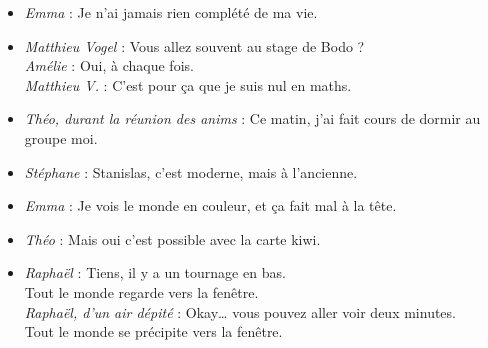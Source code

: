 \begin{itemize}
\item \textit{Emma} : \og Je n'ai jamais rien complété de ma vie. \fg

\item \textit{Matthieu Vogel} : \og Vous allez souvent au stage de Bodo ? \fg \\
\textit{Amélie} : \og Oui, à chaque fois. \fg \\
\textit{Matthieu V.} : \og C'est pour ça que je suis nul en maths. \fg

\item \textit{Théo, durant la réunion des anims} : \og Ce matin, j'ai fait cours de dormir au groupe moi. \fg

\item \textit{Stéphane} : \og Stanislas, c'est moderne, mais à l'ancienne. \fg

\item \textit{Emma} : \og Je vois le monde en couleur, et ça fait mal à la tête. \fg

\item \textit{Théo} : \og Mais oui c'est possible avec la carte kiwi. \fg

\item \textit{Raphaël} : \og Tiens, il y a un tournage en bas. \fg \\
Tout le monde regarde vers la fenêtre. \\
\textit{Raphaël, d'un air dépité} : \og Okay… vous pouvez aller voir deux minutes. \fg \\
Tout le monde se précipite vers la fenêtre.



\end{itemize}